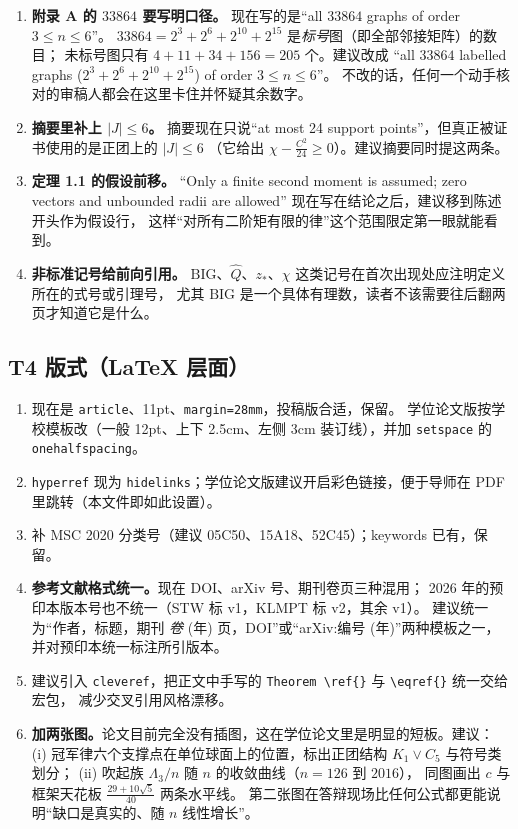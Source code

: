 \documentclass[UTF8,11pt]{ctexart}
\newcommand{\Lam}{\Lambda}
\newcommand{\file}[1]{\texttt{#1}}
\begin{document}
\begin{enumerate}[leftmargin=2em,itemsep=4pt]
\item \textbf{附录 A 的 $33864$ 要写明口径。}
现在写的是``all $33864$ graphs of order $3\le n\le6$''。
$33864=2^3+2^6+2^{10}+2^{15}$ 是\emph{标号}图（即全部邻接矩阵）的数目；
未标号图只有 $4+11+34+156=205$ 个。建议改成
``all $33864$ labelled graphs ($2^3+2^6+2^{10}+2^{15}$) of order $3\le n\le6$''。
不改的话，任何一个动手核对的审稿人都会在这里卡住并怀疑其余数字。

\item \textbf{摘要里补上 $|J|\le6$。}
摘要现在只说``at most 24 support points''，但真正被证书使用的是正团上的 $|J|\le6$
（它给出 $\chi-\frac{C^2}{24}\ge0$）。建议摘要同时提这两条。

\item \textbf{定理 1.1 的假设前移。}
``Only a finite second moment is assumed; zero vectors and unbounded radii are allowed''
现在写在结论之后，建议移到陈述开头作为假设行，
这样``对所有二阶矩有限的律''这个范围限定第一眼就能看到。

\item \textbf{非标准记号给前向引用。}
$\mathrm{BIG}$、$\widehat Q$、$z_*$、$\chi$ 这类记号在首次出现处应注明定义所在的式号或引理号，
尤其 $\mathrm{BIG}$ 是一个具体有理数，读者不该需要往后翻两页才知道它是什么。
\end{enumerate}

\subsection{T4 版式（LaTeX 层面）}

\begin{enumerate}[leftmargin=2em,itemsep=4pt]
\item 现在是 \file{article}、11pt、\file{margin=28mm}，投稿版合适，保留。
学位论文版按学校模板改（一般 12pt、上下 2.5cm、左侧 3cm 装订线），并加 \file{setspace} 的 \file{onehalfspacing}。
\item \file{hyperref} 现为 \file{hidelinks}；学位论文版建议开启彩色链接，便于导师在 PDF 里跳转（本文件即如此设置）。
\item 补 MSC 2020 分类号（建议 05C50、15A18、52C45）；keywords 已有，保留。
\item \textbf{参考文献格式统一。}现在 DOI、arXiv 号、期刊卷页三种混用；
2026 年的预印本版本号也不统一（STW 标 v1，KLMPT 标 v2，其余 v1）。
建议统一为``作者，标题，期刊 \emph{卷} (年) 页，DOI''或``arXiv:编号 (年)''两种模板之一，
并对预印本统一标注所引版本。
\item 建议引入 \file{cleveref}，把正文中手写的 \file{Theorem~\textbackslash ref\{\}} 与 \file{\textbackslash eqref\{\}} 统一交给宏包，
减少交叉引用风格漂移。
\item \textbf{加两张图。}论文目前完全没有插图，这在学位论文里是明显的短板。建议：
(i) 冠军律六个支撑点在单位球面上的位置，标出正团结构 $K_1\vee C_5$ 与符号类划分；
(ii) 吹起族 $\Lam_3/n$ 随 $n$ 的收敛曲线（$n=126$ 到 $2016$），
同图画出 $c$ 与框架天花板 $\frac{29+10\sqrt5}{40}$ 两条水平线。
第二张图在答辩现场比任何公式都更能说明``缺口是真实的、随 $n$ 线性增长''。
\end{enumerate}
\end{document}

